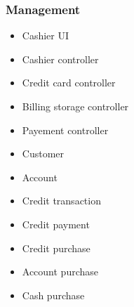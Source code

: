 \documentclass[11pt,a4paper]{article}
\begin{document}
\subsubsection*{Management}
\begin{itemize}
\item{Cashier UI}
\item{Cashier controller}
\item{Credit card controller}
\item{Billing storage controller}
\item{Payement controller}
\item{Customer}
\item{Account}
\item{Credit transaction}
\item{Credit payment}
\item{Credit purchase}
\item{Account purchase}
\item{Cash purchase}
\end{itemize}


\end{document}
